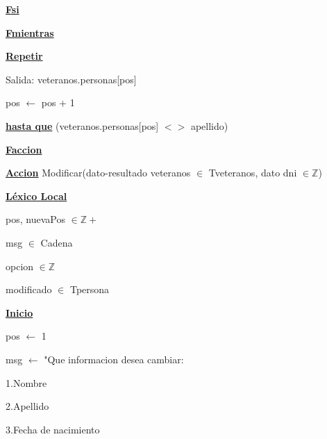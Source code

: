 \documentclass{article}
\begin{document}
                \hspace{16mm}\underline{\textbf{Fsi}}

            \hspace{12mm}\underline{\textbf{Fmientras}}

            \hspace{12mm}\underline{\textbf{Repetir}}

                \hspace{16mm}Salida: veteranos.personas[pos]

                \hspace{16mm}pos $\leftarrow$ pos + 1

            \hspace{12mm}\underline{\textbf{hasta que}} (veteranos.personas[pos] $<>$ apellido)

    \hspace{4mm}\underline{\textbf{Faccion}}

    \vspace{4mm}

    \hspace{4mm}\underline{\textbf{Accion}} Modificar(dato-resultado veteranos $\in$ Tveteranos, dato dni $\in \mathbb{Z}$)

        \hspace{8mm}\underline{\textbf{Léxico Local}}

            \hspace{12mm}pos, nuevaPos $\in \mathbb{Z}+$

            \hspace{12mm}msg $\in$ Cadena

            \hspace{12mm}opcion $\in \mathbb{Z}$

            \hspace{12mm}modificado $\in$ Tpersona

        \hspace{8mm}\underline{\textbf{Inicio}}

            \hspace{12mm}pos $\leftarrow$ 1

            \hspace{12mm}msg $\leftarrow$ "Que informacion desea cambiar: 

                \hspace{25mm}1.Nombre

                \hspace{25mm}2.Apellido

                \hspace{25mm}3.Fecha de nacimiento
\end{document}
